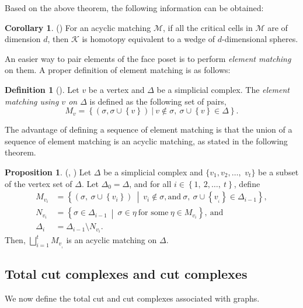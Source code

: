 \documentclass[11pt,reqno,a4paper]{amsart}
\theoremstyle{definition}
\newtheorem{definition}{Definition}[section]
\theoremstyle{theorem}
\newtheorem{prop}[theorem]{Proposition}
\newtheorem{corollary}[theorem]{Corollary}
\theoremstyle{remark}
\begin{document}
Based on the above theorem, the following information can be obtained:

\begin{corollary}\label{Corollary 1}(\cite[Corollary~2.5]{deshpande2020higher})
    For an acyclic matching $\mathcal{M}$, if all the critical cells in $\mathcal{M}$ are of dimension $d$, then $\mathcal{K}$ is homotopy equivalent to a wedge of $d$-dimensional spheres.
\end{corollary}

An easier way to pair elements of the face poset is to perform \textit{element matching} on them. A proper definition of element matching is as follows:

\begin{definition}[\cite{jonsson2008simplicial}] \label{def: Element matching}
    Let $v$ be a vertex and $\Delta$ be a simplicial complex. The \emph{element matching using $v$ on $\Delta$} is defined as the following set of pairs, \[M_{v} = \left\{\left(\sigma,\sigma \cup \left\{v\right\}\right)\ |\ v \notin \sigma,\ \sigma \cup \left\{v\right\} \in \Delta\right\}.\]
\end{definition}

The advantage of defining a sequence of element matching is that the union of a sequence of element matching is an acyclic matching, as stated in the following theorem.

\begin{prop}\label{theorem 2}(\cite[Proposition~3.1]{deshpande2020higher}, \cite[Lemma~4.1]{jonsson2008simplicial})
    Let $\Delta$ be a simplicial complex and $\{v_{1},v_{2},\dots, $ $v_{t}\}$ be a subset of the vertex set of $\Delta$. Let $\Delta_0 = \Delta$, and for all $i \in \left\{1,\ 2,\dots,\ t\right\}$, define
    \begin{align*}
        M_{v_{i}} &= \left\{\left(\sigma,\ \sigma \cup \left\{v_{i}\right\}\right)\ \middle|\ v_{i} \notin \sigma, \text{and}\ \sigma,\ \sigma \cup \left\{v_{_i}\right\} \in \Delta_{i-1}\right\},\\
        N_{v_{i}} &= \left\{\sigma \in \Delta_{i-1}\ \middle|\ \sigma \in \eta\ \text{for some}\ \eta \in M_{v_{i}}\right\},\ \text{and}\\
        \Delta_i &= \Delta_{i-1} \setminus N_{v_{i}}.
    \end{align*}
    Then, $\bigsqcup_{i=1}^t{M_{v_{_i}}}$ is an acyclic matching on $\Delta$.
\end{prop}

\subsection{Total cut complexes and cut complexes}
We now define the total cut and cut complexes associated with graphs.
\end{document}
